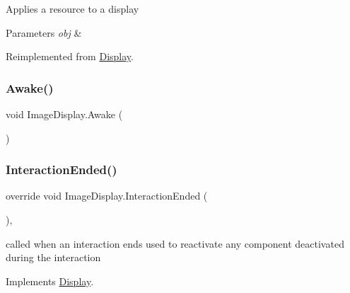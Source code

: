 Applies a resource to a display 


\begin{DoxyParams}{Parameters}
{\em obj} & \\
\hline
\end{DoxyParams}


Reimplemented from \mbox{\hyperlink{class_display_a811157ddb42ae4d72f690457a08711d3}{Display}}.

\mbox{\label{class_image_display_a3dfa32d33641e56a6623265150b8ddba}} 
\subsubsection{\texorpdfstring{Awake()}{Awake()}}
{\footnotesize\ttfamily void Image\+Display.\+Awake (\begin{DoxyParamCaption}{ }\end{DoxyParamCaption})\hspace{0.3cm}{\ttfamily [private]}}

\mbox{\label{class_image_display_a94c5928ef81449c37740d0bd0a8f4062}} 
\subsubsection{\texorpdfstring{Interaction\+Ended()}{InteractionEnded()}}
{\footnotesize\ttfamily override void Image\+Display.\+Interaction\+Ended (\begin{DoxyParamCaption}{ }\end{DoxyParamCaption})\hspace{0.3cm}{\ttfamily [protected]}, {\ttfamily [virtual]}}



called when an interaction ends used to reactivate any component deactivated during the interaction 



Implements \mbox{\hyperlink{class_display_a6fd38485267e1b78f1d1dfb589ec4ae0}{Display}}.

\mbox{\label{class_image_display_a1fdf91b09cd5329059d38033f1330ffb}} 
